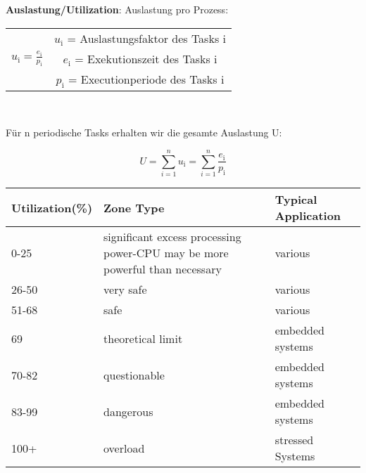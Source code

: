 \begin{multicols}{2}
  \textbf{Auslastung/Utilization}:
  Auslastung pro Prozess:
  \begin{center}
    \begin{tabular}{c c}
                                                   & $u_\text{i}$ = Auslastungsfaktor des Tasks i \\
      $u_\text{i} = \frac{e_\text{i}}{p_\text{i}}$ & $e_\text{i}$ = Exekutionszeit des Tasks i    \\
                                                   & $p_\text{i}$ = Executionperiode des Tasks i
    \end{tabular}\\
  \end{center}

\columnbreak

Für n periodische Tasks erhalten wir die gesamte Auslastung U: 
\begin{center}
\begin{equation}
U = \sum_{i=1}^{n}u_\text{i} = \sum_{i=1}^{n}\frac{e_\text{i}}{p_\text{i}}
\end{equation}
\end{center}
\end{multicols}

\begin{tabular}[c]{| l p{8cm} l |}
\hline\bfseries{Utilization(\%)} & \bfseries{Zone Type} & \bfseries{Typical Application}
\\\hline 0-25 & significant excess processing power-CPU may be more powerful than necessary & various
\\ 26-50 & very safe & various
\\ 51-68 & safe & various
\\\rowcolor{HSRBlue20} 69 & theoretical limit & embedded systems
\\ 70-82 & questionable & embedded systems
\\ 83-99 & dangerous & embedded systems
\\ 100+ & overload & stressed Systems
\\\hline
\end{tabular}
